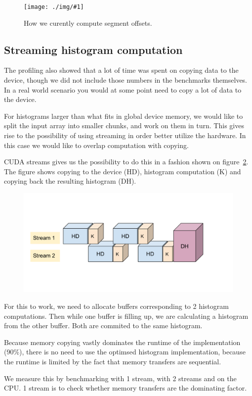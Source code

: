 \documentclass[12pt, a4paper, hidelinks]{article}
\newcommand{\fig}[3]{
\begin{figure}[h]
  \begin{center}
    \texttt{[image: ./img/\#1]}
  \end{center}
  \caption{#3}
  \label{fig:#1}
\end{figure}
}
\begin{document}
\fig{seg-offsets}{140}{How we curently compute segment offsets.}

\subsection{Streaming histogram computation}
The profiling also showed that a lot of time was spent on copying data to the device,
though we did not include those numbers in the benchmarks themselves. In a real
world scenario you would at some point need to copy a lot of data to the device.

For histograms larger than what fits in global device memory, we would like to split
the input array into smaller chunks, and work on them in turn.
This gives rise to the possibility of using streaming in order better utilize the hardware.
In this case we would like to overlap computation with copying.

CUDA streams gives us the possibility to do this in a fashion shown on figure~\ref{fig:cuda-stream}.
The figure shows copying to the device (HD),
histogram computation (K) and copying back the resulting histogram (DH).

\begin{figure}[htpb]
    \centering
    \includegraphics[width=0.8\linewidth]{img/cuda-stream.pdf}
    \label{fig:cuda-stream}
\end{figure}

For this to work, we need to allocate buffers corresponding to 2 histogram computations.
Then while one buffer is filling up, we are calculating a histogram from the other
buffer. Both are commited to the same histogram.

Because memory copying vastly dominates the runtime of the implementation (90\%),
there is no need to use the optimsed histogram implementation, because the runtime
is limited by the fact that memory transfers are sequential.

We measure this by benchmarking with 1 stream, with 2 streams and on the CPU. 1 stream
is to check whether memory transfers are the dominating factor.
\end{document}
